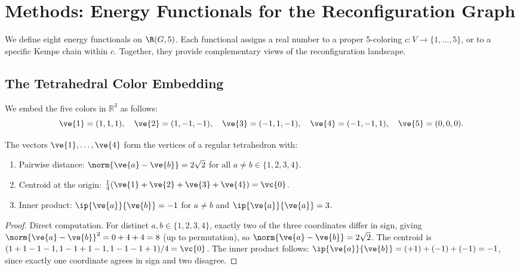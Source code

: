 
\section{Methods: Energy Functionals for the Reconfiguration Graph}
\label{sec:methods}

We define eight energy functionals on $\R(G, 5)$. Each functional
assigns a real number to a proper 5-coloring $c \colon V \to \{1,
\ldots, 5\}$, or to a specific Kempe chain within $c$. Together, they
provide complementary views of the reconfiguration landscape.

\subsection{The Tetrahedral Color Embedding}\label{sec:tet-embed}

We embed the five colors in $\mathbb{R}^3$ as follows:
\begin{equation}\label{eq:tet-embed}
  \ve{1} = (1,1,1), \quad
  \ve{2} = (1,-1,-1), \quad
  \ve{3} = (-1,1,-1), \quad
  \ve{4} = (-1,-1,1), \quad
  \ve{5} = (0,0,0).
\end{equation}

\begin{proposition}\label{prop:tet-geom}
The vectors $\ve{1}, \ldots, \ve{4}$ form the vertices of a regular
tetrahedron with:
\begin{enumerate}[label=(\alph*)]
  \item Pairwise distance: $\norm{\ve{a} - \ve{b}} = 2\sqrt{2}$ for
    all $a \neq b \in \{1,2,3,4\}$.
  \item Centroid at the origin:
    $\frac{1}{4}(\ve{1} + \ve{2} + \ve{3} + \ve{4}) = \vc{0}$.
  \item Inner product: $\ip{\ve{a}}{\ve{b}} = -1$ for $a \neq b$ and
    $\ip{\ve{a}}{\ve{a}} = 3$.
\end{enumerate}
\end{proposition}

\begin{proof}
Direct computation. For distinct $a, b \in \{1,2,3,4\}$, exactly two of
the three coordinates differ in sign, giving
$\norm{\ve{a} - \ve{b}}^2 = 0 + 4 + 4 = 8$ (up to permutation), so
$\norm{\ve{a} - \ve{b}} = 2\sqrt{2}$. The centroid is
$(1+1-1-1, 1-1+1-1, 1-1-1+1)/4 = \vc{0}$. The inner product follows:
$\ip{\ve{a}}{\ve{b}} = (+1) + (-1) + (-1) = -1$, since exactly
one coordinate agrees in sign and two disagree.
\end{proof}

